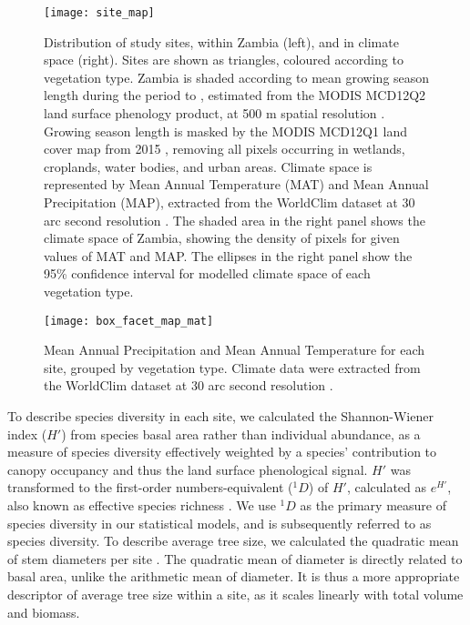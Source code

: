 \documentclass[11pt,a4paper]{article}
\begin{document}
\begin{figure}[H]
\centering
	\texttt{[image: site\_map]}
	\caption{Distribution of study sites, within Zambia (left), and in climate
		space (right). Sites are shown as triangles, coloured according to
		vegetation type. Zambia is shaded according to mean growing season length
		during the period \modisStart{} to \modisEnd{}, estimated from the MODIS
		MCD12Q2 land surface phenology product, at 500 m spatial resolution
		\citep{MCD12Q2}. Growing season length is masked by the MODIS MCD12Q1 land
		cover map from 2015 \citep{MCD12Q1}, removing all pixels occurring in wetlands,
		croplands, water bodies, and urban areas. Climate space is represented by Mean
		Annual Temperature (MAT) and Mean Annual Precipitation (MAP), extracted from
		the WorldClim dataset at 30 arc second resolution \citep{Fick2017}. The shaded
		area in the right panel shows the climate space of Zambia, showing the density
		of pixels for given values of MAT and MAP. The ellipses in the right panel show
		the 95\% confidence interval for modelled climate space of each vegetation type.} 
	\label{site_map}
\end{figure}

\setlength{\tabcolsep}{2pt} %

\setlength{\tabcolsep}{4pt} %

\begin{figure}[H]
\centering
	\texttt{[image: box\_facet\_map\_mat]}
	\caption{Mean Annual Precipitation and Mean Annual Temperature for each site, grouped by vegetation type. Climate data were extracted from the WorldClim dataset at 30 arc second resolution \citep{Fick2017}.} 
	\label{box_facet_map_mat}
\end{figure}

To describe species diversity in each site, we calculated the Shannon-Wiener
index ($H'$) from species basal area rather than individual abundance, as a
measure of species diversity effectively weighted by a species' contribution to
canopy occupancy and thus the land surface phenological signal. $H'$ was
transformed to the first-order numbers-equivalent ($^1\!D$) of $H'$, calculated
as $e^{H'}$, also known as effective species richness \citep{Jost2007}. We use
$^1\!D$ as the primary measure of species diversity in our statistical models,
and is subsequently referred to as species diversity. To describe average tree
size, we calculated the quadratic mean of stem diameters per site
\citep{Curtis2000}. The quadratic mean of diameter is directly related to basal
area, unlike the arithmetic mean of diameter. It is thus a more appropriate
descriptor of average tree size within a site, as it scales linearly with total
volume and biomass.
\end{document}
